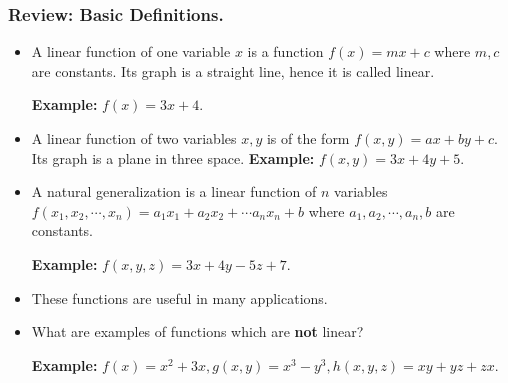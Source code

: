\begin{frame} %

  \frametitle{Review: Basic Definitions.} 
  \begin{itemize}%
  \item 
    A linear function of one variable $x$ is a function $f(x)=mx+c$ where $m,c$ are constants.
    Its graph is a straight line, hence it is called linear.
    
    {\bf Example:} $\displaystyle f(x) = 3x+4$.
   
  \item A linear function of two variables $x,y$ is of the form $f(x,y)=ax+by+c$. Its graph is a plane in three space.
  {\bf Example:} $\displaystyle f(x,y) = 3x+4y+5$.

  \item 
    A natural generalization is a linear function of $n$ variables 
    $\displaystyle f(x_1,x_2,\cdots ,x_n)= a_1x_1+a_2x_2+\cdots a_nx_n+b$
    where $a_1,a_2,\cdots , a_n,b$ are constants.
    
  {\bf Example:} $\displaystyle f(x,y,z) = 3x+4y-5z+7$.  
  \item 
   These functions are useful in many applications.
   
   \item 
   What are examples of functions which are {\bf not} linear?
   
    {\bf Example:} $\displaystyle f(x)=x^2+3x, g(x,y)=x^3-y^3, h(x,y,z)=xy+yz+zx $.
  \end{itemize}
\end{frame}

